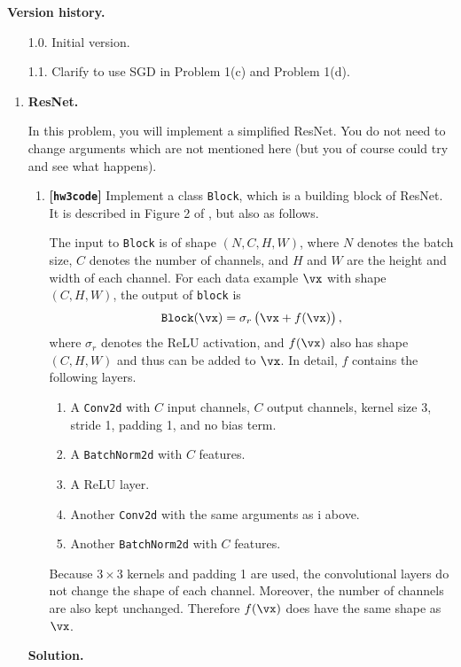 \documentclass{article}
\def\hwcode{\textbf{[\texttt{hw3code}]}\xspace}
\theoremstyle{definition}
\theoremstyle{remark}
\newenvironment{Q}
{%
\clearpage
\item
}
{%
\phantom{s} %
\bigskip
\textbf{Solution.}
}
\begin{document}
\noindent\textbf{Version history.}
\begin{enumerate}
    \item[1.0.] Initial version.
    \item[1.1.] Clarify to use SGD in Problem 1(c) and Problem 1(d).
\end{enumerate}

\begin{enumerate}[font={\Large\bfseries},left=0pt]
  


\begin{Q}
    \textbf{\Large ResNet.}
    
    In this problem, you will implement a simplified ResNet. You do not need to change arguments which are not mentioned here (but you of course could try and see what happens).
    \begin{enumerate}
        \item \hwcode
          Implement a class \texttt{Block}, which is a building block of ResNet. It is described in Figure 2 of \citet{resnet}, but also as follows.

        The input to \texttt{Block} is of shape $(N,C,H,W)$, where $N$ denotes the batch size, $C$ denotes the number of channels, and $H$ and $W$ are the height and width of each channel. For each data example $\vx$ with shape $(C,H,W)$, the output of \texttt{block} is
        \begin{align*}%
            \texttt{Block}(\vx)=\sigma_r\del{\vx+f(\vx)},
        \end{align*}
        where $\sigma_r$ denotes the ReLU activation, and $f(\vx)$ also has shape $(C,H,W)$ and thus can be added to $\vx$. In detail, $f$ contains the following layers.
        \begin{enumerate}
            \item A \texttt{Conv2d} with $C$ input channels, $C$ output channels, kernel size 3, stride 1, padding 1, and no bias term.
            \item A \texttt{BatchNorm2d} with $C$ features.
            \item A ReLU layer.
            \item Another \texttt{Conv2d} with the same arguments as i above.
            \item Another \texttt{BatchNorm2d} with $C$ features.
        \end{enumerate}
        Because $3\times3$ kernels and padding 1 are used, the convolutional layers do not change the shape of each channel. Moreover, the number of channels are also kept unchanged. Therefore $f(\vx)$ does have the same shape as $\vx$.


\end{enumerate}
\end{Q}
\end{enumerate}
\end{document}
